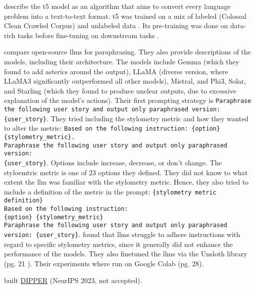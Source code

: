\citet{palivela_optimization_2021,kurt_pehlivanoglu_comparative_2024} describe the 
\ac{t5} model as an algorithm that aims to convert every language problem into a text-to-text format.
\ac{t5} was trained on a mix of labeled (Colossal Clean Crawled Corpus) and unlabeled data \citep{palivela_optimization_2021}.
Its pre-training was done on data-rich tasks before fine-tuning on downstream tasks \citep{kurt_pehlivanoglu_comparative_2024}.

\citet{master_thesis_paraphrasing_2024} compare open-source \acp{llm} for paraphrasing.
They also provide descriptions of the models, including their architecture.
The models include Gemma (which they found to add asterics around the output), LLaMA (diverse version, where LLaMA3 significantly outperformed all other models), 
Mistral, and Phi3, Solar, and Starling (which they found to produce unclear outputs, due to excessive explanation of the model's actions).
Their first prompting strategy is \texttt{Paraphrase the following user story and output only paraphrased version:\\
\{user\_story\}}.
They tried including the stylometry metric and how they wanted to alter the metric: 
\texttt{Based on the following instruction: \{option\} \{stylometry\_metric\}.\\
Paraphrase the following user story and output only paraphrased version:\\
\{user\_story\}}.
Options include increase, decrease, or don't change.
The styloemtric metric is one of 23 options they defined.
They did not know to what extent the \ac{llm} was familiar with the stylometry metric. 
Hence, they also tried to include a definition of the metric in the prompt:
\texttt{\{stylometry metric definition\}\\Based on the following instruction:\\
\{option\} \{stylometry\_metric\} \\
Paraphrase the following user story and output only paraphrased version: \{user\_story\}}.
\citet{master_thesis_paraphrasing_2024} found that \acp{llm} struggle to adhere instructions with regard to specific stylometry metrics, 
since it generally did not enhance the performance of the models.
They also finetuned the \acp{llm} via the Unsloth library (pg. 21 \citep{master_thesis_paraphrasing_2024}).
Their experiments where run on Google Colab (pg. 28).

\citet{krishna_paraphrasing_2023} built \href{https://huggingface.co/kalpeshk2011/dipper-paraphraser-xxl}{DIPPER} (NeurIPS 2023, not accepted).
 

